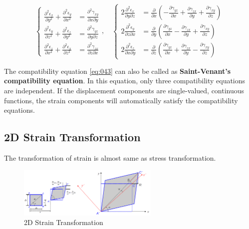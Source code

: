 \documentclass[en,hazy,cyan,8pt,normal]{elegantnote}
\numberwithin{equation}{section}
\begin{document}
    \begin{equation}\label{eq:043}
      \left\{
      \begin{aligned}
        \frac{\partial^2 \epsilon_x}{\partial y^2} + \frac{\partial^2 \epsilon_y}{\partial x^2} &= \frac{\partial^2 \gamma_{xy}}{\partial x \partial y} \\
        \frac{\partial^2 \epsilon_y}{\partial z^2} + \frac{\partial^2 \epsilon_z}{\partial y^2} &= \frac{\partial^2 \gamma_{yz}}{\partial y \partial z} \\
        \frac{\partial^2 \epsilon_z}{\partial x^2} + \frac{\partial^2 \epsilon_x}{\partial z^2} &= \frac{\partial^2 \gamma_{zx}}{\partial z \partial x}
      \end{aligned}
      \right.
      , \quad
      \left\{
      \begin{aligned}
        2 \frac{\partial^2 \epsilon_x}{\partial y \partial z} &= \frac{\partial}{\partial x} \left( -\frac{\partial \gamma_{yz}}{\partial x} + \frac{\partial \gamma_{zx}}{\partial y} + \frac{\partial \gamma_{xy}}{\partial z} \right) \\
        2 \frac{\partial^2 \epsilon_y}{\partial z \partial x} &= \frac{\partial}{\partial y} \left( \frac{\partial \gamma_{yz}}{\partial x} - \frac{\partial \gamma_{zx}}{\partial y} + \frac{\partial \gamma_{xy}}{\partial z} \right) \\
        2 \frac{\partial^2 \epsilon_z}{\partial x \partial y} &= \frac{\partial}{\partial z} \left( \frac{\partial \gamma_{yz}}{\partial x} + \frac{\partial \gamma_{zx}}{\partial y} - \frac{\partial \gamma_{xy}}{\partial z} \right)
      \end{aligned}
      \right.
    \end{equation}

    The compatibility equation \cref{eq:043} can also be called as \textbf{Saint-Venant's compatibility equation}. In this equation, only three compatibility equations are independent. If the displacement components are single-valued, continuous functions, the strain components will automatically satisfy the compatibility equations.\\

  \subsection{2D Strain Transformation}\label{subsec:02.04}
  The transformation of strain is almost same as stress transformation.

  \begin{figure}[H]
    \centering
    \includegraphics[width=0.6\textwidth]{image/013.png}
    \caption{2D Strain Transformation}
    \label{fig:013}
  \end{figure}
\end{document}
